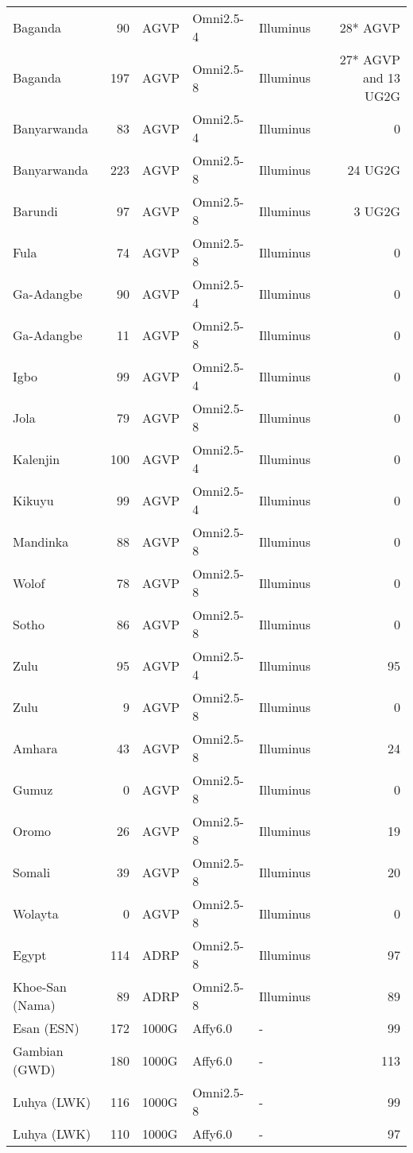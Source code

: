 \begin{table}[htp]
\begin{tabular}{lrlllr}
Baganda & 90 & AGVP & Omni2.5-4 & Illuminus & 28* AGVP \\
Baganda & 197 & AGVP & Omni2.5-8 & Illuminus & 27* AGVP and 13 UG2G \\
Banyarwanda & 83 & AGVP & Omni2.5-4 & Illuminus & 0 \\
Banyarwanda & 223 & AGVP & Omni2.5-8 & Illuminus & 24 UG2G \\
Barundi & 97 & AGVP & Omni2.5-8 & Illuminus & 3 UG2G \\
Fula & 74 & AGVP & Omni2.5-8 & Illuminus & 0 \\
Ga-Adangbe & 90 & AGVP & Omni2.5-4 & Illuminus & 0 \\
Ga-Adangbe & 11 & AGVP & Omni2.5-8 & Illuminus & 0 \\
Igbo & 99 & AGVP & Omni2.5-4 & Illuminus & 0 \\
Jola & 79 & AGVP & Omni2.5-8 & Illuminus & 0 \\
Kalenjin & 100 & AGVP & Omni2.5-4 & Illuminus & 0 \\
Kikuyu & 99 & AGVP & Omni2.5-4 & Illuminus & 0 \\
Mandinka & 88 & AGVP & Omni2.5-8 & Illuminus & 0 \\
Wolof & 78 & AGVP & Omni2.5-8 & Illuminus & 0 \\
Sotho & 86 & AGVP & Omni2.5-8 & Illuminus & 0 \\
Zulu & 95 & AGVP & Omni2.5-4 & Illuminus & 95 \\
Zulu & 9 & AGVP & Omni2.5-8 & Illuminus & 0 \\
Amhara & 43 & AGVP & Omni2.5-8 & Illuminus & 24 \\
Gumuz & 0 & AGVP & Omni2.5-8 & Illuminus & 0 \\
Oromo & 26 & AGVP & Omni2.5-8 & Illuminus & 19 \\
Somali & 39 & AGVP & Omni2.5-8 & Illuminus & 20 \\
Wolayta & 0 & AGVP & Omni2.5-8 & Illuminus & 0 \\
Egypt & 114 & ADRP & Omni2.5-8 & Illuminus & 97 \\
Khoe-San (Nama) & 89 & ADRP & Omni2.5-8 & Illuminus & 89 \\

Esan (ESN) & 172 & 1000G & Affy6.0 & - & 99  \\

Gambian (GWD) & 180 & 1000G & Affy6.0 & - & 113  \\

Luhya (LWK) & 116 & 1000G & Omni2.5-8 & - & 99 \\
Luhya (LWK) & 110 & 1000G & Affy6.0 & - & 97  \\


\end{tabular}
\end{table}
